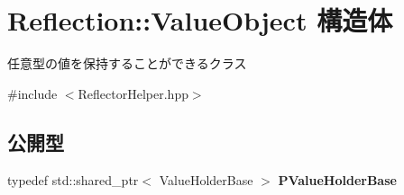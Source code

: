 \hypertarget{struct_reflection_1_1_value_object}{}\section{Reflection\+:\+:Value\+Object 構造体}
\label{struct_reflection_1_1_value_object}


任意型の値を保持することができるクラス 




{\ttfamily \#include $<$Reflector\+Helper.\+hpp$>$}

\subsection*{公開型}
\begin{DoxyCompactItemize}
\item 
typedef std\+::shared\+\_\+ptr$<$ Value\+Holder\+Base $>$ {\bfseries P\+Value\+Holder\+Base}\hypertarget{struct_reflection_1_1_value_object_a71dff8a994aca6d289c178149b262cad}{}\label{struct_reflection_1_1_value_object_a71dff8a994aca6d289c178149b262cad}

\end{DoxyCompactItemize}
